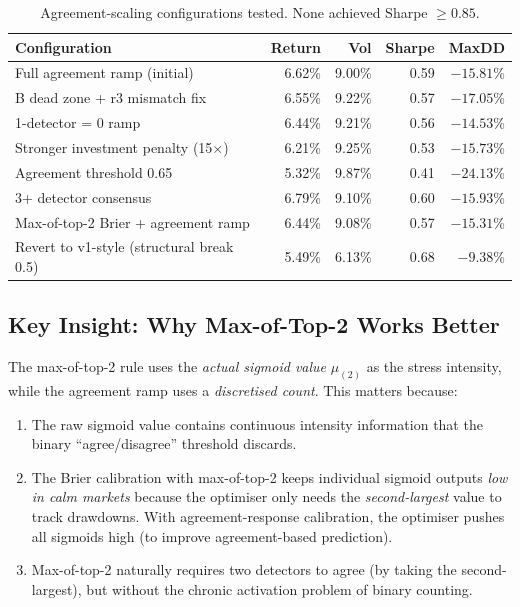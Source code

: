 \documentclass[11pt,a4paper]{article}
\begin{document}
\begin{table}[h]
\centering
\small
\begin{tabular}{p{5cm}rrrr}
\toprule
\textbf{Configuration} & \textbf{Return} & \textbf{Vol} & \textbf{Sharpe} & \textbf{MaxDD} \\
\midrule
Full agreement ramp (initial) & 6.62\% & 9.00\% & 0.59 & $-15.81$\% \\
B dead zone + r3 mismatch fix & 6.55\% & 9.22\% & 0.57 & $-17.05$\% \\
1-detector = 0 ramp & 6.44\% & 9.21\% & 0.56 & $-14.53$\% \\
Stronger investment penalty (15$\times$) & 6.21\% & 9.25\% & 0.53 & $-15.73$\% \\
Agreement threshold 0.65 & 5.32\% & 9.87\% & 0.41 & $-24.13$\% \\
3+ detector consensus & 6.79\% & 9.10\% & 0.60 & $-15.93$\% \\
Max-of-top-2 Brier + agreement ramp & 6.44\% & 9.08\% & 0.57 & $-15.31$\% \\
Revert to v1-style (structural break 0.5) & 5.49\% & 6.13\% & 0.68 & $-9.38$\% \\
\bottomrule
\end{tabular}
\caption{Agreement-scaling configurations tested. None achieved Sharpe $\ge 0.85$.}
\label{tab:v2-attempts}
\end{table}

\subsection{Key Insight: Why Max-of-Top-2 Works Better}

The max-of-top-2 rule uses the \emph{actual sigmoid value} $\mu_{(2)}$ as the stress intensity, while the agreement ramp uses a \emph{discretised count}. This matters because:

\begin{enumerate}[nosep]
  \item The raw sigmoid value contains continuous intensity information that the binary ``agree/disagree'' threshold discards.
  \item The Brier calibration with max-of-top-2 keeps individual sigmoid outputs \emph{low in calm markets} because the optimiser only needs the \emph{second-largest} value to track drawdowns. With agreement-response calibration, the optimiser pushes all sigmoids high (to improve agreement-based prediction).
  \item Max-of-top-2 naturally requires two detectors to agree (by taking the second-largest), but without the chronic activation problem of binary counting.
\end{enumerate}
\end{document}
